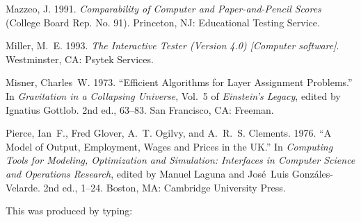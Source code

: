 \documentclass{tPRS2e}
\begin{document}
\begin{thebibliography}{99}
Mazzeo, J. 1991. \emph{Comparability of Computer and Paper-and-Pencil Scores}
 (College Board Rep. No. 91). Princeton, NJ: Educational Testing Service.

Miller, M.~E. 1993. \emph{The Interactive Tester (Version 4.0) [Computer
 software]}. Westminster, CA: Psytek Services.

Misner, Charles~W. 1973. ``Efficient Algorithms for Layer Assignment
 Problems.'' In \emph{Gravitation in a Collapsing {U}niverse}, Vol.~5 of
 \emph{Einstein's Legacy}, edited by Ignatius Gottlob. 2nd ed., 63--83. San
 Francisco, CA: Freeman.

Pierce, Ian~F., Fred Glover, A.~T. Ogilvy, and A.~R.~S. Clements. 1976.
 ``A Model of Output, Employment, Wages and Prices in the {UK}.'' In
 \emph{Computing Tools for Modeling, Optimization and Simulation: Interfaces
 in Computer Science and Operations Research}, edited by Manuel Laguna and
 Jos\'{e}~Luis Gonz\'{a}les-Velarde. 2nd ed., 1--24. Boston, MA:
 Cambridge University Press.

\end{thebibliography}
\bigskip
\noindent This was produced by typing:
\end{document}
